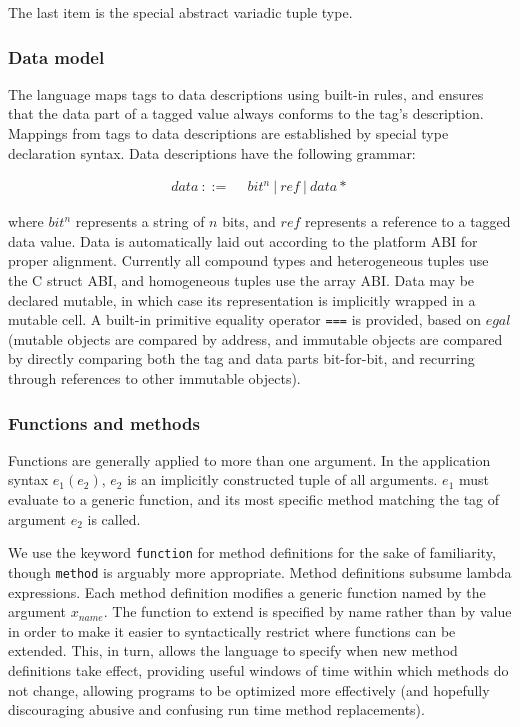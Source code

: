 \noindent
The last item is the special abstract variadic tuple type.

\subsubsection{Data model}

The language maps tags to data descriptions using built-in rules, and ensures that
the data part of a tagged value always conforms to the tag's description.
Mappings from tags to data descriptions are established by special type
declaration syntax.
Data descriptions have the following grammar:

\vspace{-3ex}
\begin{singlespace}
\begin{align*}
data\ ::=\ &\ bit^n\ |\ ref\ |\ data*
\end{align*}
\end{singlespace}

\noindent
where $bit^n$ represents a string of $n$ bits, and $ref$ represents a reference
to a tagged data value.
Data is automatically laid out according to the platform ABI for proper
alignment.
Currently all compound types and heterogeneous tuples use the C struct ABI, and
homogeneous tuples use the array ABI.
Data may be declared mutable, in which case its representation is implicitly
wrapped in a mutable cell.
A built-in primitive equality operator \texttt{===} is provided, based on
$egal$ \cite{egal} (mutable objects are compared by address, and immutable objects
are compared by directly comparing both the tag and data parts bit-for-bit, and
recurring through references to other immutable objects).

\subsubsection{Functions and methods}

Functions are generally applied to more than one argument. In the application
syntax $e_1(e_2)$, $e_2$ is an implicitly constructed tuple of all arguments.
$e_1$ must evaluate to a generic function, and its most specific method
matching the tag of argument $e_2$ is called.

We use the keyword \texttt{function} for method definitions for the sake of
familiarity, though \texttt{method} is arguably more appropriate. Method
definitions subsume lambda expressions. Each method definition modifies a
generic function named by the argument $x_{name}$. The function to extend is
specified by name rather than by value in order to make it easier to syntactically
restrict where functions can be extended. This, in turn, allows the language to
specify when new method definitions take effect, providing useful windows of
time within which methods do not change, allowing programs to be optimized more
effectively (and hopefully discouraging abusive and confusing run time
method replacements).

